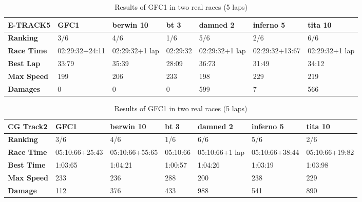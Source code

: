 \documentclass[conference]{IEEEtran}
\begin{document}
\begin{table}[!ht]
	\centering
	{\scriptsize
		\caption{Results of GFC1 in two real races (5 laps)}
		\label{tab:gfc1real}
		\begin{tabular}{|p{2 cm}|p{1.5 cm}|p{1.5 cm}|p{1.5 cm}|p{1.5 cm}|p{1.5 cm}|p{1.5 cm}|}
			\hline \textbf{E-TRACK5} &   \textbf{GFC1} & \textbf{berwin 10} & \textbf{bt 3} &\textbf{damned 2} & \textbf{inferno 5} & \textbf{tita 10}  \\
			\hline \textbf{Ranking} & 3/6&4/6&1/6&5/6&2/6&6/6\\			
			\hline \textbf{Race Time}	& 02:29:32\newline+24:11&02:29:32\newline +1 lap &02:29:32&02:29:32\newline +1 lap &02:29:32\newline+13:67&02:29:32\newline+1 lap\\	
			\hline \textbf{Best Lap}&33:79& 35:39&28:09&36:73&31:49&34:12\\	
			\hline \textbf{Max Speed}& 199&206&233&198&229&219\\	
			\hline \textbf{Damages}& 0&0&0&599&7&566 \\	
			\hline 
		\end{tabular}
		
		\begin{tabular}{|p{2 cm}|p{1.5 cm}|p{1.5 cm}|p{1.5 cm}|p{1.5 cm}|p{1.5 cm}|p{1.5 cm}|}
			\hline \textbf{CG Track2} & \textbf{GFC1}&\textbf{berwin 10} & \textbf{bt 3} &\textbf{damned 2} & \textbf{inferno 5} & \textbf{tita 10}  \\
			\hline \textbf{Ranking} & 3/6&4/6&1/6&6/6&5/6&2/6\\			
			\hline \textbf{Race Time}	&  05:10:66\newline +25:43&  05:10:66\newline+55:65& 05:10:66& 05:10:66\newline+1 lap& 05:10:66\newline+38:44& 05:10:66\newline+19:82\\	
			\hline \textbf{Best Time}& 1:03:65 &1:04:21&1:00:57&1:04:26&1:03:19&1:03:98\\	
			\hline \textbf{Max Speed}& 233&236&288&200&238&229\\
			\hline \textbf{Damage}& 112& 376 & 433&988&541&890\\	
			\hline 
		\end{tabular}
	}
\end{table}
\end{document}
